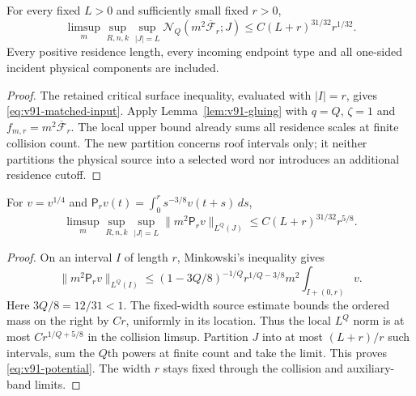 \begin{theorem}
\label{thm:v91-surface}
For every fixed $L>0$ and sufficiently small fixed $r>0$,
\begin{equation}\label{eq:v91-surface}
 \limsup_m\sup_{R,n,k}\sup_{|J|=L}
 \mathcal N_Q(m^2\overline{\mathcal F}_r;J)
                  \le C(L+r)^{31/32}r^{1/32}.
\end{equation}
Every positive residence length, every incoming endpoint type and
all one-sided incident physical components are included.
\end{theorem}
\begin{proof}
The retained critical surface inequality, evaluated with $|I|=r$,
gives \eqref{eq:v91-matched-input}. Apply
Lemma~\ref{lem:v91-gluing} with $q=Q$, $\zeta=1$ and
$f_{m,r}=m^2\overline{\mathcal F}_r$. The local upper bound already
sums all residence scales at finite collision count. The new
partition concerns roof intervals only; it neither partitions the
physical source into a selected word nor introduces an additional
residence cutoff.
\end{proof}

\begin{lemma}
\label{lem:v91-potential}
For $v=v^{1/4}$ and $\mathsf P_r v(t)=\int_0^r s^{-3/8}v(t+s)\,ds$,
\begin{equation}\label{eq:v91-potential}
 \limsup_m\sup_{R,n,k}\sup_{|J|=L}
 \|m^2\mathsf P_r v\|_{L^Q(J)}
                   \le C(L+r)^{31/32}r^{5/8}.
\end{equation}
\end{lemma}
\begin{proof}
On an interval $I$ of length $r$, Minkowski's inequality gives
\[
 \|m^2\mathsf P_r v\|_{L^Q(I)}
 \le (1-3Q/8)^{-1/Q}r^{1/Q-3/8}
                          m^2\int_{I+(0,r)}v.
\]
Here $3Q/8=12/31<1$. The fixed-width source estimate bounds the
ordered mass on the right by $Cr$, uniformly in its location.
Thus the local $L^Q$ norm is at most $Cr^{1/Q+5/8}$ in the
collision limsup. Partition $J$ into at most $(L+r)/r$ such
intervals, sum the $Q$th powers at finite count and take the limit.
This proves \eqref{eq:v91-potential}. The width $r$ stays fixed
through the collision and auxiliary-band limits.
\end{proof}

